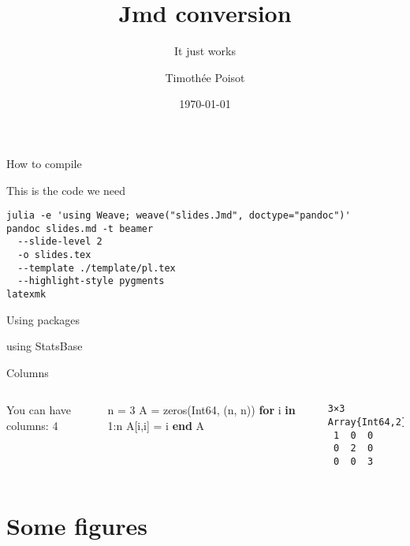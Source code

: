 \documentclass[11pt, compress, aspectratio=1610, serif]{beamer}
\title{Jmd conversion}
\subtitle{It just works}
\date{\today}
\author{Timothée Poisot}
\institute{LOLOLOL}
\newenvironment{Shaded}{}{}
\newcommand{\KeywordTok}[1]{\textcolor[rgb]{0.00,0.44,0.13}{\textbf{{#1}}}}
\newcommand{\DataTypeTok}[1]{\textcolor[rgb]{0.56,0.13,0.00}{{#1}}}
\newcommand{\FloatTok}[1]{\textcolor[rgb]{0.25,0.63,0.44}{{#1}}}
\newcommand{\NormalTok}[1]{{#1}}
\newcommand{\begincols}{\begin{columns}}
\newcommand{\stopcols}{\end{columns}}
\begin{document}
\maketitle

\begin{frame}[fragile]{How to compile}

This is the code we need

\begin{verbatim}
julia -e 'using Weave; weave("slides.Jmd", doctype="pandoc")'
pandoc slides.md -t beamer
  --slide-level 2
  -o slides.tex
  --template ./template/pl.tex
  --highlight-style pygments
latexmk
\end{verbatim}

\end{frame}

\begin{frame}[fragile]{Using packages}

\begin{Shaded}
\begin{Highlighting}[]
\NormalTok{using StatsBase}
\end{Highlighting}
\end{Shaded}

\end{frame}

\begin{frame}[fragile]{Columns}

\begincols
{}

You can have columns: 4


\begin{Shaded}
\begin{Highlighting}[]
\NormalTok{n = }\FloatTok{3}
\NormalTok{A = zeros(}\DataTypeTok{Int64}\NormalTok{, (n, n))}
\KeywordTok{for} \NormalTok{i }\KeywordTok{in} \FloatTok{1}\NormalTok{:n}
  \NormalTok{A[i,i] = i}
\KeywordTok{end}
\NormalTok{A}
\end{Highlighting}
\end{Shaded}

\begin{verbatim}
3×3 Array{Int64,2}:
 1  0  0
 0  2  0
 0  0  3
\end{verbatim}

\stopcols

\end{frame}

\section{Some figures}\label{some-figures}
\end{document}
